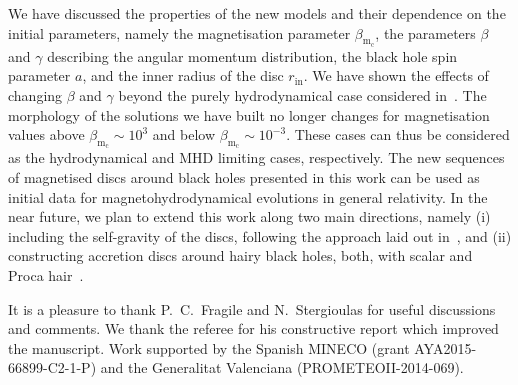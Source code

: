 \documentclass{aa}
\begin{document}
We have discussed the properties of the new models and their dependence on the initial parameters, namely the magnetisation parameter $\beta_{\mathrm{m}_{\mathrm{c}}}$, the parameters $\beta$ and $\gamma$ describing the angular momentum distribution, the black hole spin parameter $a$, and the inner radius of the disc $r_{\mathrm{in}}$. We have shown the effects of changing $\beta$ and $\gamma$ beyond the purely hydrodynamical case considered in~\citet{Qian:2009}. The morphology of the solutions we have built no longer changes for magnetisation values above $\beta_{\mathrm{m}_{\mathrm{c}}} \sim 10^{3}$ and below $\beta_{\mathrm{m}_{\mathrm{c}}} \sim 10^{-3}$. These cases can thus be considered as the hydrodynamical and MHD limiting cases, respectively. The new sequences of magnetised discs around black holes presented in this work can be used as initial data for magnetohydrodynamical evolutions in general relativity. In the near future, we plan to extend this work along two main directions, namely (i) including the self-gravity of the discs, following the approach laid out in~\citet{Stergioulas:2011}, and (ii) constructing accretion discs around hairy black holes, both, with scalar and Proca hair~\citep{Herdeiro:2014,Herdeiro:2016}.

\begin{acknowledgements}
It is a pleasure to thank P.~C.~Fragile and N.~Stergioulas for useful discussions and comments. We thank the referee for his constructive report which improved the manuscript. Work supported by the Spanish MINECO (grant AYA2015-66899-C2-1-P) and the Generalitat Valenciana (PROMETEOII-2014-069).
\end{acknowledgements}



\end{document}
